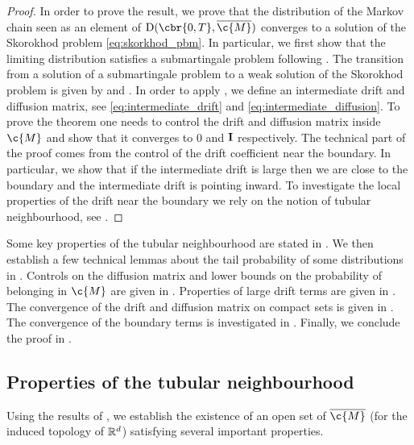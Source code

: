 \begin{proof}
	In order to prove the result, we prove that the distribution of the Markov chain seen as an element of $\mathrm{D}(\cbr{0,T}, \cl{\c{M}})$ converges to a solution of the Skorokhod problem \eqref{eq:skorkhod_pbm}.
	In particular, we first show that the limiting distribution satisfies a submartingale problem following \cite[Theorem 6.3]{stroock1971diffusion}.
	The transition from a solution of a submartingale problem to a weak solution of the Skorokhod problem is given by \cite[Theorem 1, Proposition 2.12]{kang2017submartingale} and \cite[Corollary 2.10]{ramanan2006reflected}.
	In order to apply \cite[Theorem 6.3]{stroock1971diffusion}, we define an intermediate drift and diffusion matrix, see \eqref{eq:intermediate_drift} and \eqref{eq:intermediate_diffusion}.
	To prove the theorem one needs to control the drift and diffusion matrix inside $\c{M}$ and show that it converges to $0$ and $\m{I}$ respectively.
	The technical part of the proof comes from the control of the drift coefficient near the boundary.
	In particular, we show that if the intermediate drift is large then we are close to the boundary and the intermediate drift is pointing inward.
	To investigate the local properties of the drift near the boundary we rely on the notion of tubular neighbourhood, see \cite[Theorem 6.24]{lee2013smooth}.
\end{proof}

Some key properties of the tubular neighbourhood are stated in .
We then establish a few technical lemmas about the tail probability of some distributions in .
Controls on the diffusion matrix and lower bounds on the probability of belonging in $\c{M}$ are given in .
Properties of large drift terms are given in .
The convergence of the drift and diffusion matrix on compact sets is given in .
The convergence of the boundary terms is investigated in .
Finally, we conclude the proof in .

\subsection{Properties of the tubular neighbourhood}
\label{sec:tubular_properties}

Using the results of \cite{lee2013smooth}, we establish the existence of an open set of $\cl{\c{M}}$ (for the induced topology of $\mathbb{R}^d$) satisfying several important properties.

